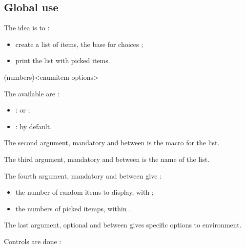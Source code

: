 \documentclass[english,11pt,a4paper]{article}
\begin{document}
\subsection{Global use}

The idea is to :

\begin{itemize}
	\item create a list of items, the base for choices ;
	\item print the list with picked items.
\end{itemize}

\begin{codehigh}[language=latex/latex3,style/main=teal!25,style/code=teal!25]
\end{codehigh}

\begin{codehigh}[language=latex/latex3,style/main=teal!25,style/code=teal!25]
(numbers)<enumitem options>
\end{codehigh}

The available  are :

\begin{itemize}
	\item {} :  or  ;
	\item {}  :  by default.
\end{itemize}

The second argument, mandatory and between  is the macro for the list.

The third argument, mandatory and between  is the name of the list.

The fourth argument, mandatory and between  give :

\begin{itemize}
	\item the number of random items to display, with  ;
	\item the numbers of picked itemps, within .
\end{itemize}


The last argument, optional and between  gives specific options to  environment.

\medskip

Controls are done :
\end{document}

